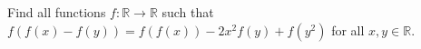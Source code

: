 Find all functions $ f : \mathbb{R} \to\mathbb{R}$ such that $f(f(x)-f(y))=f(f(x))-2x^2f(y)+f(y^2)$ for all $x,y \in \mathbb{R}.$